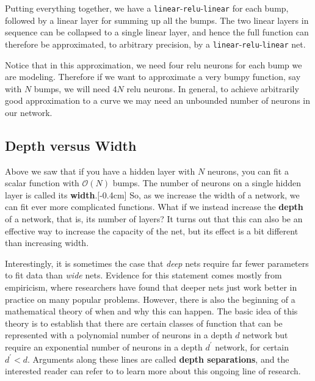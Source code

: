 Putting everything together, we have a \texttt{linear}-\texttt{relu}-\texttt{linear} for each bump, followed by a linear layer for summing up all the bumps. The two linear layers in sequence can be collapsed to a single linear layer, and hence the full function can therefore be approximated, to arbitrary precision, by a \texttt{linear}-\texttt{relu}-\texttt{linear} net.


Notice that in this approximation, we need four relu neurons for each bump we are modeling. Therefore if we want to approximate a very bumpy function, say with $N$ bumps, we will need $4N$ relu neurons. In general, to achieve arbitrarily good approximation to a curve we may need an unbounded number of neurons in our network.

\subsection{Depth versus Width}
Above we saw that if you have a hidden layer with $N$ neurons, you can fit a scalar function with $\mathcal{O}(N)$ bumps. The number of neurons on a single hidden layer is called its \textbf{width}.[-0.4cm] So, as we increase the width of a network, we can fit ever more complicated functions. What if we instead increase the \textbf{depth} of a network, that is, its number of layers? It turns out that this can also be an effective way to increase the capacity of the net, but its effect is a bit different than increasing width.

Interestingly, it is sometimes the case that \textit{deep} nets require far fewer parameters to fit data than \textit{wide} nets. Evidence for this statement comes mostly from empiricism, where researchers have found that deeper nets just work better in practice on many popular problems. However, there is also the beginning of a mathematical theory of when and why this can happen. The basic idea of this theory is to establish that there are certain classes of function that can be represented with a polynomial number of neurons in a depth $d$ network but require an exponential number of neurons in a depth $d^\prime$ network, for certain $d^\prime < d$. Arguments along these lines are called \textbf{depth separations}, and the interested reader can refer to \cite{telgarsky2016benefits} to learn more about this ongoing line of research.

